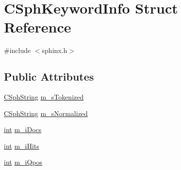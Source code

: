 \hypertarget{structCSphKeywordInfo}{\section{C\-Sph\-Keyword\-Info Struct Reference}
\label{structCSphKeywordInfo}
}


{\ttfamily \#include $<$sphinx.\-h$>$}

\subsection*{Public Attributes}
\begin{DoxyCompactItemize}
\item 
\hyperlink{structCSphString}{C\-Sph\-String} \hyperlink{structCSphKeywordInfo_a023e6c0d5cf3ecca130aaf7e4361703d}{m\-\_\-s\-Tokenized}
\item 
\hyperlink{structCSphString}{C\-Sph\-String} \hyperlink{structCSphKeywordInfo_aec58183f5458757a7a74db246672142c}{m\-\_\-s\-Normalized}
\item 
\hyperlink{sphinxexpr_8cpp_a4a26e8f9cb8b736e0c4cbf4d16de985e}{int} \hyperlink{structCSphKeywordInfo_afeea74f7fbd4c698d502a913bf8d5039}{m\-\_\-i\-Docs}
\item 
\hyperlink{sphinxexpr_8cpp_a4a26e8f9cb8b736e0c4cbf4d16de985e}{int} \hyperlink{structCSphKeywordInfo_a56952dd5ff67045e587a5fe45707e4a1}{m\-\_\-i\-Hits}
\item 
\hyperlink{sphinxexpr_8cpp_a4a26e8f9cb8b736e0c4cbf4d16de985e}{int} \hyperlink{structCSphKeywordInfo_af3a27ad40ed697a6bd6199592ae8b486}{m\-\_\-i\-Qpos}
\end{DoxyCompactItemize}


